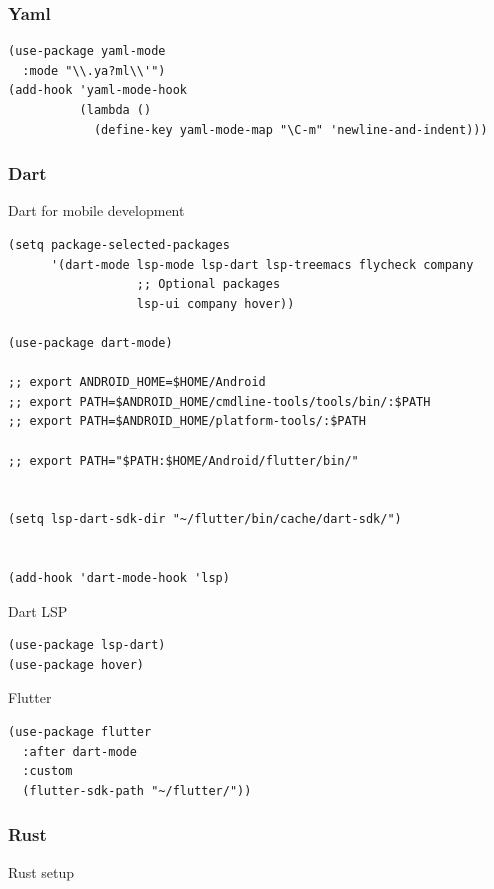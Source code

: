 \documentclass[11pt]{article}
\begin{document}
\subsubsection{Yaml}
\label{sec:org9e2bbaf}
\begin{verbatim}
(use-package yaml-mode
  :mode "\\.ya?ml\\'")
(add-hook 'yaml-mode-hook
          (lambda ()
            (define-key yaml-mode-map "\C-m" 'newline-and-indent)))
\end{verbatim}

\subsubsection{Dart}
\label{sec:orgdb9300e}

Dart for mobile development

\begin{verbatim}
(setq package-selected-packages 
      '(dart-mode lsp-mode lsp-dart lsp-treemacs flycheck company
                  ;; Optional packages
                  lsp-ui company hover))

(use-package dart-mode)

;; export ANDROID_HOME=$HOME/Android
;; export PATH=$ANDROID_HOME/cmdline-tools/tools/bin/:$PATH
;; export PATH=$ANDROID_HOME/platform-tools/:$PATH

;; export PATH="$PATH:$HOME/Android/flutter/bin/"


(setq lsp-dart-sdk-dir "~/flutter/bin/cache/dart-sdk/")


(add-hook 'dart-mode-hook 'lsp)

\end{verbatim}

Dart LSP

\begin{verbatim}
(use-package lsp-dart) 
(use-package hover) 
\end{verbatim}

Flutter

\begin{verbatim}
(use-package flutter
  :after dart-mode
  :custom
  (flutter-sdk-path "~/flutter/"))
\end{verbatim}

\subsubsection{Rust}
\label{sec:org482eb2e}

Rust setup
\end{document}
